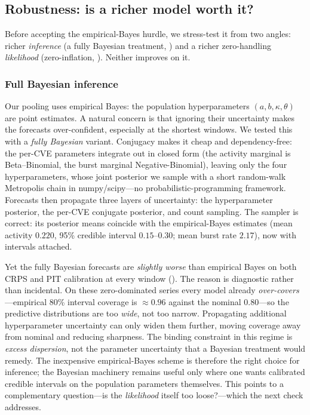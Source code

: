 \documentclass[]{article}
\begin{document}
\subsection{Robustness: is a richer model worth it?}\label{sec:bayes}
Before accepting the empirical-Bayes hurdle, we stress-test it from two angles:
richer \emph{inference} (a fully Bayesian treatment, ) and a
richer zero-handling \emph{likelihood} (zero-inflation, ). Neither
improves on it.

\subsubsection{Full Bayesian inference}\label{sec:bayes-full}
Our pooling uses empirical Bayes: the population hyperparameters
$(a,b,\kappa,\theta)$ are point estimates. A natural concern is that ignoring
their uncertainty makes the forecasts over-confident, especially at the shortest
windows. We tested this with a \emph{fully Bayesian} variant. Conjugacy makes it
cheap and dependency-free: the per-CVE parameters integrate out in closed form
(the activity marginal is Beta--Binomial, the burst marginal Negative-Binomial),
leaving only the four hyperparameters, whose joint posterior we sample with a
short random-walk Metropolis chain in numpy/scipy---no probabilistic-programming
framework. Forecasts then propagate three layers of uncertainty: the
hyperparameter posterior, the per-CVE conjugate posterior, and count sampling.
The sampler is correct: its posterior means coincide with the empirical-Bayes
estimates (mean activity $0.220$, 95\% credible interval $0.15$--$0.30$; mean
burst rate $2.17$), now with intervals attached.

Yet the fully Bayesian forecasts are \emph{slightly worse} than empirical Bayes on
both CRPS and PIT calibration at every window (). The
reason is diagnostic rather than incidental. On these zero-dominated series every
model already \emph{over-covers}---empirical 80\% interval coverage is
$\approx 0.96$ against the nominal $0.80$---so the predictive distributions are
too \emph{wide}, not too narrow. Propagating additional hyperparameter uncertainty
can only widen them further, moving coverage away from nominal and reducing
sharpness. The binding constraint in this regime is \emph{excess dispersion}, not
the parameter uncertainty that a Bayesian treatment would remedy. The inexpensive
empirical-Bayes scheme is therefore the right choice for inference; the Bayesian
machinery remains useful only where one wants calibrated credible intervals on the
population parameters themselves. This points to a complementary question---is the
\emph{likelihood} itself too loose?---which the next check addresses.
\end{document}
